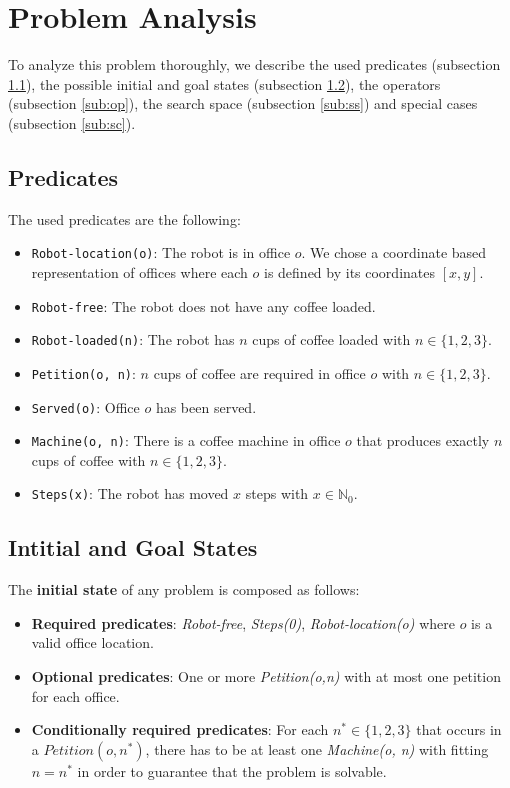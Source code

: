 \section{Problem Analysis}
\label{sec:PA}

To analyze this problem thoroughly, we describe the used predicates (subsection \ref{sub:pred}), the possible initial and goal states (subsection \ref{sub:igs}), the operators (subsection \ref{sub:op}), the search space (subsection \ref{sub:ss}) and special cases (subsection \ref{sub:sc}).

\subsection{Predicates}
\label{sub:pred}

The used predicates are the following:

\begin{itemize}
	\item \texttt{Robot-location(o)}: The robot is in office $ o $. We chose a coordinate based representation of offices where each $ o $ is defined by its coordinates $[x, y]$. 
	\item \texttt{Robot-free}: The robot does not have any coffee loaded.
	\item \texttt{Robot-loaded(n)}: The robot has $ n $ cups of coffee loaded with $n \in \{1, 2, 3\} $.
	\item \texttt{Petition(o, n)}: $ n $ cups of coffee are required in office $ o $ with $n \in \{1, 2, 3\} $.
	\item \texttt{Served(o)}: Office $ o $ has been served.
	\item \texttt{Machine(o, n)}: There is a coffee machine in office $ o $ that produces exactly $ n $ cups of coffee with $n \in \{1, 2, 3\} $.
	\item \texttt{Steps(x)}: The robot has moved $ x $ steps with $ x \in \mathbb{N}_0 $.
\end{itemize}

\subsection{Intitial and Goal States}
\label{sub:igs}

The \textbf{initial state} of any problem is composed as follows: 

\begin{itemize}
	\item \textbf{Required predicates}: \textit{Robot-free}, \textit{Steps(0)}, \textit{Robot-location(o)} where $ o $ is a valid office location.
	\item \textbf{Optional predicates}: One or more \textit{Petition(o,n)} with at most one petition for each office. 
	\item \textbf{Conditionally required predicates}: For each $ n^* \in \{1, 2, 3\} $ that occurs in a $ Petition(o, n^*) $, there has to be at least one \textit{Machine(o, n)} with fitting $ n = n^* $ in order to guarantee that the problem is solvable.
\end{itemize}

